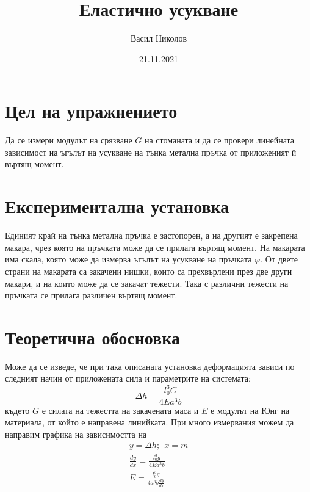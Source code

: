 \documentclass[aps, prb, twocolumn, a4paper, floatfix, reprint]{revtex4-2}
\let\phi\varphi
\begin{document}
\title{Еластично усукване}
\author{Васил Николов}
\noaffiliation
\date{21.11.2021}
\maketitle

\section{Цел на упражнението}
Да се измери модулът на срязване $G$ на стоманата и да се провери линейната зависимост на ъгълът на усукване на тънка метална пръчка от приложеният й въртящ момент.

\section{Експериментална установка}
Единият край на тънка метална пръчка е застопорен, а на другият е закрепена макара, чрез която на пръчката може да се прилага въртящ момент. На макарата има скала, която може да измерва ъгълът на усукване на пръчката $\phi$. От двете страни на макарата са закачени нишки, които са прехвърлени през две други макари, и на които може да се закачат тежести. Така с различни тежести на пръчката се прилага различен въртящ момент.

\section{Теоретична обосновка}
Може да се изведе, че при така описаната установка деформацията зависи по следният начин от приложената сила и параметрите на системата:
\begin{equation} \label{eq:1}
    \Delta h=\frac{l_0^3 G}{4E a^3 b}
\end{equation}
където $G$ е силата на тежестта на закачената маса и $E$ е модулът на Юнг на материала, от който е направена линийката. При много измервания можем да направим графика на зависимостта на 
\begin{gather*} \label{eq:2}
    y=\Delta h; \ \ x = m \\
    \frac{dy}{dx} = \frac{l_0^3 g}{4E a^3 b} \\
    E = \frac{l_0^3 g}{4a^3 b \frac{dy}{dx}} \tag{2}
\end{gather*}
\end{document}
